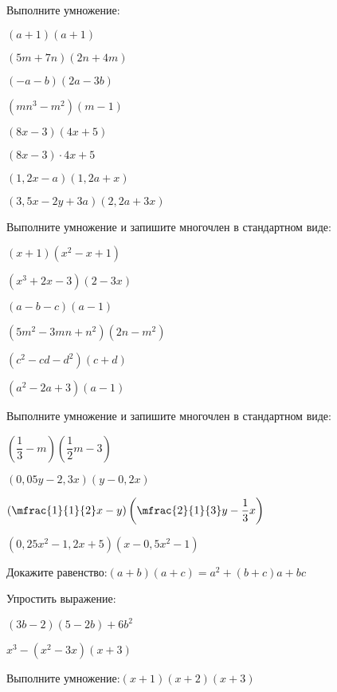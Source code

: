 \begin{class}[type=class, number=3]
	\begin{listofex}
		\item Выполните умножение:
		\begin{enumcols}[itemcolumns=2]
			\item \( (a+1)(a+1) \)
			\item \( (5m+7n)(2n+4m) \)
			\item \( (-a-b)(2a-3b) \)
			\item \( (mn^3-m^2)(m-1) \)
			\item \( (8x-3)(4x+5) \)
			\item \( (8x-3)\cdot4x+5 \)
			\item \( (1,2x-a)(1,2a+x) \)
			\item \( (3,5x-2y+3a)(2,2a+3x) \)
		\end{enumcols}
		\item Выполните умножение и запишите многочлен в стандартном виде:
		\begin{enumcols}[itemcolumns=3]
			\item \( (x+1)(x^2-x+1) \)
			\item \( (x^3+2x-3)(2-3x) \)
			\item \( (a-b-c)(a-1) \)
			\item \( (5m^2-3mn+n^2)(2n-m^2) \)
			\item \( (c^2-cd-d^2)(c+d) \)
			\item \( (a^2-2a+3)(a-1) \)
		\end{enumcols}
		\item Выполните умножение и запишите многочлен в стандартном виде:
		\begin{enumcols}[itemcolumns=2]
			\item \( \left( \dfrac{1}{3}-m \right)\left( \dfrac{1}{2}m-3 \right) \)
			\item \( (0,05y-2,3x)(y-0,2x) \)
			\item \( \left( \mfrac{1}{1}{2}x-y \right)\left( \mfrac{2}{1}{3}y-\dfrac{1}{3}x \right) \)
			\item \( (0,25x^2-1,2x+5)(x-0,5x^2-1) \)
		\end{enumcols}
		\item Докажите равенство:\quad\( (a+b)(a+c)=a^2+(b+c)a+bc \)
		\item Упростить выражение:
		\begin{enumcols}[itemcolumns=2]
			\item \( (3b-2)(5-2b)+6b^2 \)
			\item \( x^3-(x^2-3x)(x+3) \)
		\end{enumcols}
		\item Выполните умножение:\quad\( (x+1)(x+2)(x+3) \)
	\end{listofex}
\end{class}

